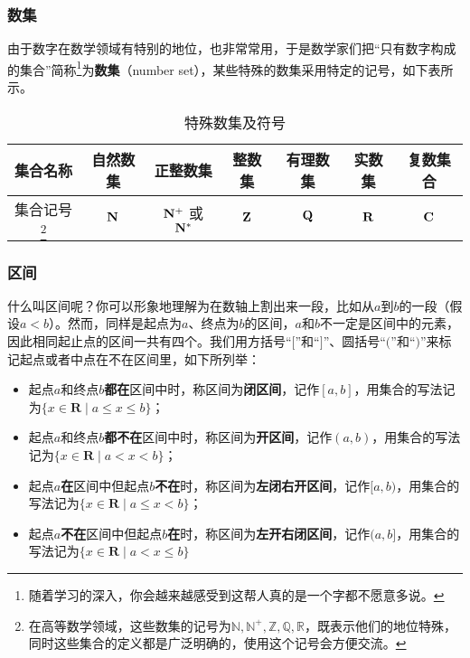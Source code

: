 \subsubsection{数集}

由于数字在数学领域有特别的地位，也非常常用，于是数学家们把“只有数字构成的集合”简称\footnote{随着学习的深入，你会越来越感受到这帮人真的是一个字都不愿意多说。}为\textbf{数集}（number set），某些特殊的数集采用特定的记号，如下表所示。

\begin{table}[ht]
\centering
\caption{特殊数集及符号}\label{tab_HsSet2}
\begin{tabular}{|c|c|c|c|c|c|c|}
\hline
集合名称 &自然数集  &正整数集  & 整数集 & 有理数集& 实数集& 复数集合 \\
\hline
集合记号\footnote{在高等数学领域，这些数集的记号为$\mathbb{N,N^+,Z,Q,R}$，既表示他们的地位特殊，同时这些集合的定义都是广泛明确的，使用这个记号会方便交流。} & ${\rm \mathbf{N}}$ & ${\rm \mathbf{N^+}}$ 或 ${\rm \mathbf{N^*}}$ & ${\rm \mathbf{Z}}$ & ${\rm \mathbf{Q}}$ & ${\rm \mathbf{R}}$ & ${\rm \mathbf{C}}$ \\
\hline
\end{tabular}
\end{table}









\subsubsection{区间}

什么叫区间呢？你可以形象地理解为在数轴上割出来一段，比如从$a$到$b$的一段（假设$a<b$）。然而，同样是起点为$a$、终点为$b$的区间，$a$和$b$不一定是区间中的元素，因此相同起止点的区间一共有四个。我们用方括号“$[$”和“$]$”、圆括号“$($”和“$)$”来标记起点或者中点在不在区间里，如下所列举：
\begin{itemize}
\item 起点$a$和终点$b$\textbf{都在}区间中时，称区间为\textbf{闭区间}，记作$[a,b]$，用集合的写法记为$\{x\in\mathbf{R}\mid a\leq x\leq b\}$；
\item 起点$a$和终点$b$\textbf{都不在}区间中时，称区间为\textbf{开区间}，记作$(a,b)$，用集合的写法记为$\{x\in\mathbf{R}\mid a< x<b\}$；
\item 起点$a$\textbf{在}区间中但起点$b$\textbf{不在}时，称区间为\textbf{左闭右开区间}，记作$[a,b)$，用集合的写法记为$\{x\in\mathbf{R}\mid a\leq x< b\}$；
\item 起点$a$\textbf{不在}区间中但起点$b$\textbf{在}时，称区间为\textbf{左开右闭区间}，记作$(a,b]$，用集合的写法记为$\{x\in\mathbf{R}\mid a< x\leq b\}$
\end{itemize}



